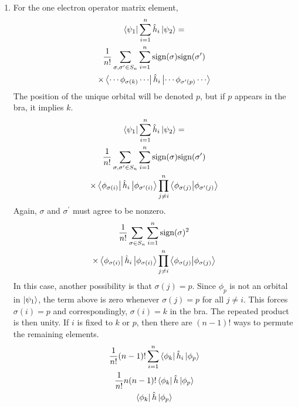 \documentclass[final,3p,times,twocolumn]{elsarticle}
\begin{document}
\begin{enumerate}
	\item For the one electron operator matrix element,
	\begin{gather}
	\begin{gathered}
	\bra{\psi_1}\sum_{i=1}^n \hat h_i \ket{\psi_2} = \\ \frac{1}{n!} \sum_{\sigma, \sigma^\prime \in S_n}\sum_{i=1}^n \text{sign}(\sigma)\text{sign}(\sigma^\prime) \\
	\times \bra{\cdots\phi_{\sigma(k)}\cdots} \hat h_i \ket{\cdots\phi_{\sigma^\prime(p)}\cdots}
	\end{gathered}
	\end{gather}
	The position of the unique orbital will be denoted $p$, but if $p$ appears in the bra, it implies $k$.
	\begin{gather}
	\begin{gathered}
	\bra{\psi_1}\sum_{i=1}^n \hat h_i \ket{\psi_2} = \\ \frac{1}{n!} \sum_{\sigma, \sigma^\prime \in S_n}\sum_{i=1}^n \text{sign}(\sigma)\text{sign}(\sigma^\prime) \\
	\times \bra{\phi_{\sigma(i)}}\hat h_i \ket{\phi_{\sigma^\prime(i)}} \prod_{j\neq i}^n \bra{\phi_{\sigma(j)}}\ket{\phi_{\sigma^\prime(j)}}
	\end{gathered}
	\end{gather}
	Again, $\sigma$ and $\sigma^\prime$ must agree to be nonzero.
	\begin{gather} \label{eq:hexp}
	\begin{gathered}
	 \frac{1}{n!} \sum_{\sigma \in S_n}\sum_{i=1}^n \text{sign}(\sigma)^2 \\
	\times \bra{\phi_{\sigma(i)}}\hat h_i \ket{\phi_{\sigma(i)}} \prod_{j\neq i}^n \bra{\phi_{\sigma(j)}}\ket{\phi_{\sigma(j)}}
	\end{gathered}
	\end{gather}
	In this case, another possibility is that $\sigma(j) = p$. Since $\phi_p$ is not an orbital in $\ket{\psi_1}$, the term above is zero whenever $\sigma(j) = p$ for all $j \neq i$. This forces $\sigma(i) = p$ and correspondingly, $\sigma(i) = k$ in the bra. The repeated product is then unity. If $i$ is fixed to $k$ or $p$, then there are $(n-1)!$ ways to permute the remaining elements.
	\begin{gather}
	 \frac{1}{n!}(n-1)!\sum_{i=1}^n \bra{\phi_{k}}\hat h_i \ket{\phi_{p}} \\
	 \frac{1}{n!}n(n-1)!\bra{\phi_{k}}\hat h \ket{\phi_{p}} \\
	 \bra{\phi_k}\hat h \ket{\phi_p}
	\end{gather}
	

\end{enumerate}
\end{document}
